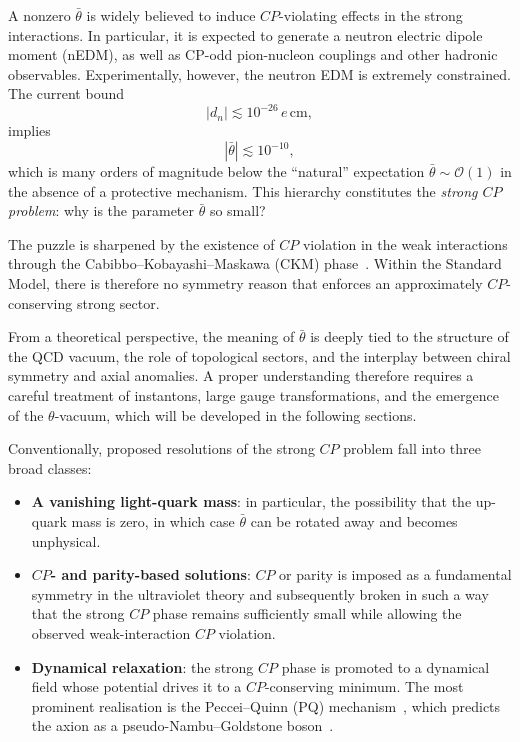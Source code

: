 \documentclass[review]{elsarticle}
\numberwithin{equation}{section}
\numberwithin{table}{section}
\numberwithin{figure}{section}
\begin{document}
A nonzero $\bar{\theta}$ is widely believed to induce $CP$-violating effects in the strong interactions. In particular, it is expected to generate a neutron electric dipole moment (nEDM), as well as CP-odd pion-nucleon couplings and other hadronic observables. Experimentally, however, the neutron EDM is extremely constrained. The current bound~\cite{Baker:2006ts,Abel:2020pzs}
\begin{equation}
    |d_n| \lesssim 10^{-26}\,e\,\mathrm{cm},
\end{equation}
implies
\begin{equation}
    |\bar{\theta}| \lesssim 10^{-10},
\end{equation}
which is many orders of magnitude below the ``natural'' expectation $\bar{\theta}\sim\mathcal{O}(1)$ in the absence of a protective mechanism. This hierarchy constitutes the \emph{strong $CP$ problem}: why is the parameter $\bar{\theta}$ so small?

The puzzle is sharpened by the existence of $CP$ violation in the weak interactions through the Cabibbo--Kobayashi--Maskawa (CKM) phase~\cite{Kobayashi:1973fv}. Within the Standard Model, there is therefore no symmetry reason that enforces an approximately $CP$-conserving strong sector.

From a theoretical perspective, the meaning of $\bar{\theta}$ is deeply tied to the structure of the QCD vacuum, the role of topological sectors, and the interplay between chiral symmetry and axial anomalies. A proper understanding therefore requires a careful treatment of instantons, large gauge transformations, and the emergence of the $\theta$-vacuum, which will be developed in the following sections.

\medskip

Conventionally, proposed resolutions of the strong $CP$ problem fall into three broad classes:
\begin{itemize}
\item[(1)] \textbf{A vanishing light-quark mass}: in particular, the possibility that the up-quark mass is zero, in which case $\bar\theta$ can be rotated away and becomes unphysical.

\item[(2)] \textbf{$CP$- and parity-based solutions}: $CP$ or parity is imposed as a fundamental symmetry in the ultraviolet theory and subsequently broken in such a way that the strong $CP$ phase remains sufficiently small while allowing the observed weak-interaction $CP$ violation.

\item[(3)] \textbf{Dynamical relaxation}: the strong $CP$ phase is promoted to a dynamical field whose potential drives it to a $CP$-conserving minimum. The most prominent realisation is the Peccei--Quinn (PQ) mechanism~\cite{Peccei:1977hh}, which predicts the axion as a pseudo-Nambu--Goldstone boson~\cite{Weinberg:1977ma,Wilczek:1977pj}.
\end{itemize}
\end{document}
